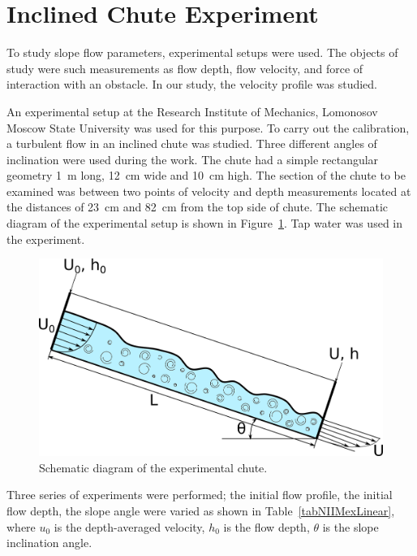 \documentclass[mathematics,article,submit,pdftex,moreauthors]{Definitions/mdpi}
\begin{document}
\section{Inclined Chute Experiment }

To study slope flow parameters, experimental setups were used. The objects of study were such measurements as flow depth, flow velocity, and force of interaction with an obstacle. In our study, the velocity profile was studied.

An experimental setup at the Research Institute of Mechanics, Lomonosov Moscow State University \cite{fluids7030111} was used for this purpose. To carry out the calibration, a turbulent flow in an inclined chute was studied. Three different angles of inclination were used during the work. The chute had a simple rectangular geometry 1~m long, 12~cm wide and 10~cm high. The section of the chute to be examined was between two points of velocity and depth measurements located at the distances of 23~cm and 82~cm from the top side of chute. The schematic diagram of the experimental setup is shown in Figure~\ref{NIIMexLinearUProfileInlet}. Tap water was used in the experiment.

\begin{figure}[H]
\begin{center}
\includegraphics[width=10.5 cm]{NIIMexLinearUProfileInlet.png}
\caption{Schematic diagram of the experimental chute.\label{NIIMexLinearUProfileInlet}}
\end{center}
\end{figure}   
\unskip

Three series of experiments were performed; the initial flow profile, the initial flow depth, the slope angle were varied as shown in Table~\ref{tabNIIMexLinear}, where $u_0$ is the depth-averaged velocity, $h_0$ is the flow depth, $\theta$ is the slope inclination angle.
\end{document}
